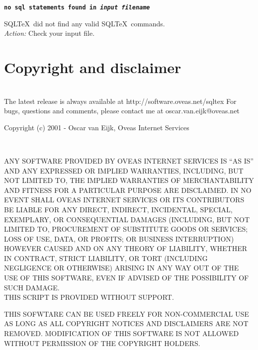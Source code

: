 \documentclass{article}
\newcommand{\vs}{\vspace{3mm}}
\begin{document}
\vs

\noindent\textbf{\texttt{no sql statements found in \textit{input filename}}}

\vspace{1mm}

\noindent SQL\TeX\ did not find any valid SQL\TeX\ commands. \\
\textit{Action:} Check your input file.

\section{Copyright and disclaimer}

\noindent\hrulefill \\
The latest release is always available at http://software.oveas.net/sqltex
For bugs, questions and comments, please contact me at
oscar.van.eijk@oveas.net

\vspace{3mm}

\noindent Copyright (c) 2001 - Oscar van Eijk, Oveas Internet Services

\noindent\hrulefill \\

\begin{small}
\noindent ANY SOFTWARE PROVIDED BY OVEAS INTERNET SERVICES IS ``AS IS'' AND ANY
EXPRESSED OR IMPLIED WARRANTIES, INCLUDING, BUT NOT LIMITED TO, THE IMPLIED
WARRANTIES OF MERCHANTABILITY AND FITNESS FOR A PARTICULAR PURPOSE ARE
DISCLAIMED. IN NO EVENT SHALL OVEAS INTERNET SERVICES OR ITS CONTRIBUTORS BE
LIABLE FOR ANY DIRECT, INDIRECT, INCIDENTAL, SPECIAL, EXEMPLARY, OR
CONSEQUENTIAL DAMAGES (INCLUDING, BUT NOT LIMITED TO, PROCUREMENT OF
SUBSTITUTE GOODS OR SERVICES; LOSS OF USE, DATA, OR PROFITS; OR BUSINESS
INTERRUPTION) HOWEVER CAUSED AND ON ANY THEORY OF LIABILITY, WHETHER IN
CONTRACT, STRICT LIABILITY, OR TORT (INCLUDING NEGLIGENCE OR OTHERWISE)
ARISING IN ANY WAY OUT OF THE USE OF THIS SOFTWARE, EVEN IF ADVISED OF
THE POSSIBILITY OF SUCH DAMAGE. \\
THIS SCRIPT IS PROVIDED WITHOUT SUPPORT.

\vspace{2mm}

\noindent THIS SOFWTARE CAN BE USED FREELY FOR NON-COMMERCIAL USE AS LONG AS ALL
COPYRIGHT NOTICES AND DISCLAIMERS ARE NOT REMOVED.
MODIFICATION OF THIS SOFTWARE IS NOT ALLOWED WITHOUT PERMISSION OF THE
COPYRIGHT HOLDERS.
\end{small}
\end{document}
